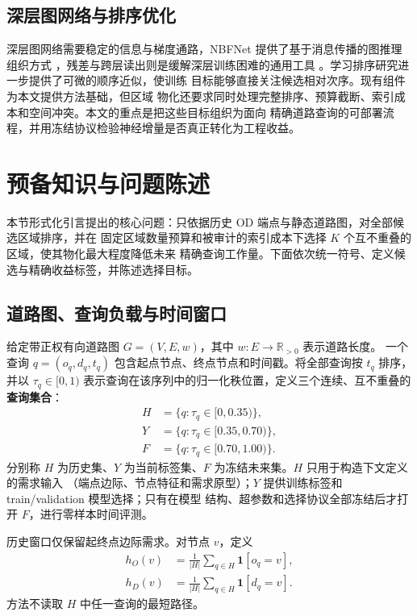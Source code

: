 \documentclass[UTF8,a4paper,10pt,twocolumn]{ctexart}
\begin{document}
\subsection{深层图网络与排序优化}

深层图网络需要稳定的信息与梯度通路，NBFNet 提供了基于消息传播的图推理组织方式
\citep{zhu2021nbfnet}，残差与跨层读出则是缓解深层训练困难的通用工具
\citep{li2020deepergcn,touvron2021layerscale}。学习排序研究进一步提供了可微的顺序近似，使训练
目标能够直接关注候选相对次序\citep{jagerman2022rax}。现有组件为本文提供方法基础，但区域
物化还要求同时处理完整排序、预算截断、索引成本和空间冲突。本文的重点是把这些目标组织为面向
精确道路查询的可部署流程，并用冻结协议检验神经增量是否真正转化为工程收益。

\section{预备知识与问题陈述}

本节形式化引言提出的核心问题：只依据历史 OD 端点与静态道路图，对全部候选区域排序，并在
固定区域数量预算和被审计的索引成本下选择 $K$ 个互不重叠的区域，使其物化最大程度降低未来
精确查询工作量。下面依次统一符号、定义候选与精确收益标签，并陈述选择目标。

\subsection{道路图、查询负载与时间窗口}

给定带正权有向道路图 $G=(V,E,w)$，其中 $w:E\rightarrow\mathbb{R}_{>0}$ 表示道路长度。
一个查询 $q=(o_q,d_q,t_q)$ 包含起点节点、终点节点和时间戳。将全部查询按 $t_q$ 排序，并以
$\tau_q\in[0,1)$ 表示查询在该序列中的归一化秩位置，定义三个连续、互不重叠的\textbf{查询集合}：
\begin{equation}
  \begin{aligned}
  H&=\{q:\tau_q\in[0,0.35)\},\\
  Y&=\{q:\tau_q\in[0.35,0.70)\},\\
  F&=\{q:\tau_q\in[0.70,1.00)\}.
  \end{aligned}
\end{equation}
分别称 $H$ 为历史集、$Y$ 为当前标签集、$F$ 为冻结未来集。$H$ 只用于构造下文定义的需求输入
（端点边际、节点特征和需求原型）；$Y$ 提供训练标签和 train/validation 模型选择；只有在模型
结构、超参数和选择协议全部冻结后才打开 $F$，进行零样本时间评测。

历史窗口仅保留起终点边际需求。对节点 $v$，定义
\begin{equation}
  \begin{aligned}
  h_O(v)&=\frac{1}{|H|}\sum_{q\in H}\mathbf{1}[o_q=v],\\
  h_D(v)&=\frac{1}{|H|}\sum_{q\in H}\mathbf{1}[d_q=v].
  \end{aligned}
\end{equation}
方法不读取 $H$ 中任一查询的最短路径。
\end{document}
